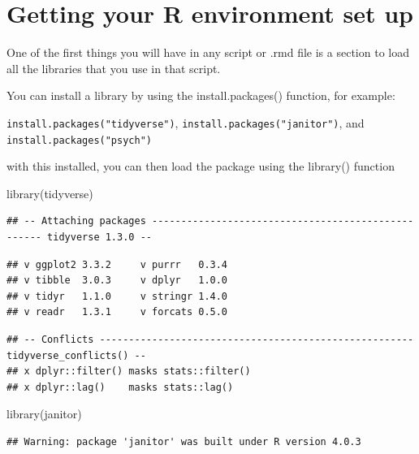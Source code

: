 \documentclass[
]{book}
\newenvironment{Shaded}{\begin{snugshade}}{\end{snugshade}}
\newcommand{\FunctionTok}[1]{\textcolor[rgb]{0.00,0.00,0.00}{#1}}
\newcommand{\NormalTok}[1]{#1}
\begin{document}
\hypertarget{getting-your-r-environment-set-up}{%
\section{Getting your R environment set up}\label{getting-your-r-environment-set-up}}

One of the first things you will have in any script or .rmd file is a section to load all the libraries that you use in that script.

You can install a library by using the install.packages() function, for example:

\texttt{install.packages("tidyverse")}, \texttt{install.packages("janitor")}, and \texttt{install.packages("psych")}

with this installed, you can then load the package using the library() function

\begin{Shaded}
\begin{Highlighting}[]
\FunctionTok{library}\NormalTok{(tidyverse)}
\end{Highlighting}
\end{Shaded}

\begin{verbatim}
## -- Attaching packages --------------------------------------------------- tidyverse 1.3.0 --
\end{verbatim}

\begin{verbatim}
## v ggplot2 3.3.2     v purrr   0.3.4
## v tibble  3.0.3     v dplyr   1.0.0
## v tidyr   1.1.0     v stringr 1.4.0
## v readr   1.3.1     v forcats 0.5.0
\end{verbatim}

\begin{verbatim}
## -- Conflicts ------------------------------------------------------ tidyverse_conflicts() --
## x dplyr::filter() masks stats::filter()
## x dplyr::lag()    masks stats::lag()
\end{verbatim}

\begin{Shaded}
\begin{Highlighting}[]
\FunctionTok{library}\NormalTok{(janitor)}
\end{Highlighting}
\end{Shaded}

\begin{verbatim}
## Warning: package 'janitor' was built under R version 4.0.3
\end{verbatim}
\end{document}
